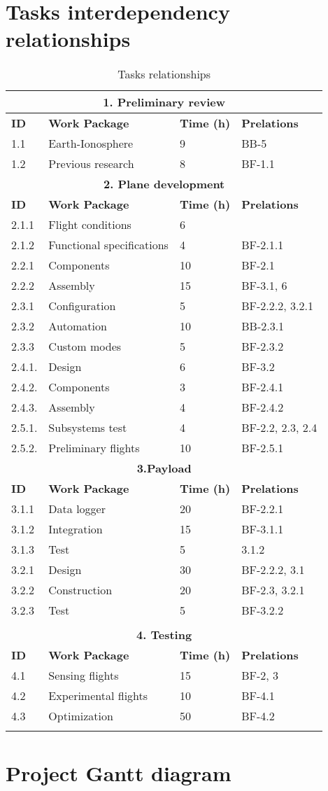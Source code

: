 \section{Tasks interdependency relationships}
\begin{longtable}[htb]{@{}llll@{}}\toprule[3pt]

\multicolumn{4}{c}{\textbf{\large 1. Preliminary review} }\\ \midrule[2pt]
\textbf{ID} & \textbf{Work Package} &\textbf{Time (h)} &\textbf{Prelations}\\ \midrule[1pt]
	1.1& Earth-Ionosphere& 9 &BB-5\\
	1.2& Previous research& 8 & BF-1.1\\
	\midrule[2pt]
\multicolumn{4}{c}{\textbf{\large 2. Plane development} }\\ \midrule[2pt]
\textbf{ID} & \textbf{Work Package} &\textbf{Time (h)} &\textbf{Prelations}\\ \midrule[1pt]
	2.1.1& Flight conditions& 6& \\
	2.1.2& Functional specifications& 4&BF-2.1.1 \\
	2.2.1& Components& 10&BF-2.1\\
	2.2.2& Assembly& 15& BF-3.1, 6\\
	2.3.1& Configuration& 5&BF-2.2.2, 3.2.1\\
	2.3.2& Automation& 10&BB-2.3.1\\
	2.3.3& Custom modes& 5&BF-2.3.2 \\
	2.4.1.& Design& 6&BF-3.2\\
	2.4.2.& Components& 3&BF-2.4.1\\
	2.4.3.& Assembly& 4&BF-2.4.2\\
	2.5.1.& Subsystems test& 4&BF-2.2, 2.3, 2.4\\
	2.5.2.& Preliminary flights& 10&BF-2.5.1\\
	\midrule[2pt]
\multicolumn{4}{c}{\textbf{\large 3.Payload} }\\ \midrule[2pt]
\textbf{ID} & \textbf{Work Package} &\textbf{Time (h)} &\textbf{Prelations}\\ \midrule[1pt]
	3.1.1& Data logger& 20&BF-2.2.1\\
	3.1.2& Integration& 15&BF-3.1.1\\
	3.1.3& Test& 5&3.1.2\\
	3.2.1& Design& 30&BF-2.2.2, 3.1\\
	3.2.2& Construction& 20&BF-2.3, 3.2.1\\
	3.2.3& Test& 5&BF-3.2.2\\
	& & & \\
\midrule[2pt]
\multicolumn{4}{c}{\textbf{\large 4. Testing} }\\ \midrule[2pt]
\textbf{ID} & \textbf{Work Package} &\textbf{Time (h)} &\textbf{Prelations}\\ \midrule[1pt]
	4.1& Sensing flights& 15& BF-2, 3\\
	4.2& Experimental flights& 10& BF-4.1\\
	4.3& Optimization& 50&BF-4.2 \\
\bottomrule[3pt]
\caption{Tasks relationships}
\end{longtable}
\section{Project Gantt diagram}
